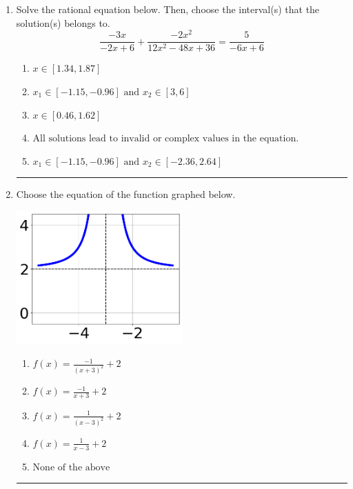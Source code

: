 \documentclass[14pt]{extbook}
\newcommand{\litem}[1]{\item#1\hspace*{-1cm}\rule{\textwidth}{0.4pt}}
\begin{document}
\begin{enumerate}
{\begin{enumerate}[label=\Alph*.]
\end{enumerate} }
\litem{
Solve the rational equation below. Then, choose the interval(s) that the solution(s) belongs to.\[ \frac{-3x}{-2x + 6} + \frac{-2x^{2}}{12x^{2} -48 x + 36} = \frac{5}{-6x + 6} \]\begin{enumerate}[label=\Alph*.]
\item \( x \in [1.34,1.87] \)
\item \( x_1 \in [-1.15, -0.96] \text{ and } x_2 \in [3,6] \)
\item \( x \in [0.46,1.62] \)
\item \( \text{All solutions lead to invalid or complex values in the equation.} \)
\item \( x_1 \in [-1.15, -0.96] \text{ and } x_2 \in [-2.36,2.64] \)

\end{enumerate} }
\litem{
Choose the equation of the function graphed below.
\begin{center}
    \includegraphics[width=0.5\textwidth]{../Figures/rationalGraphToEquationA.png}
\end{center}
\begin{enumerate}[label=\Alph*.]
\item \( f(x) = \frac{-1}{(x + 3)^2} + 2 \)
\item \( f(x) = \frac{-1}{x + 3} + 2 \)
\item \( f(x) = \frac{1}{(x - 3)^2} + 2 \)
\item \( f(x) = \frac{1}{x - 3} + 2 \)
\item \( \text{None of the above} \)


\end{enumerate}}
\end{enumerate}
\end{document}
